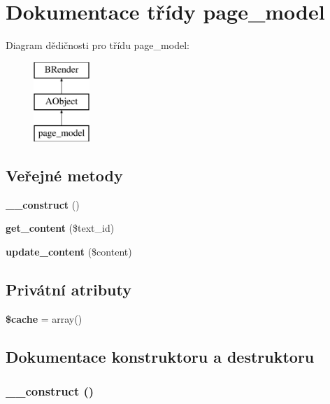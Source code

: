 \section{Dokumentace třídy page\_\-model}
\label{da/d19/classpage__model}
Diagram dědičnosti pro třídu page\_\-model:\begin{figure}[H]
\begin{center}
\leavevmode
\includegraphics[height=3cm]{da/d19/classpage__model}
\end{center}
\end{figure}
\subsection*{Veřejné metody}
\begin{DoxyCompactItemize}
\item 
{\bf \_\-\_\-construct} ()
\item 
{\bf get\_\-content} (\$text\_\-id)
\item 
{\bf update\_\-content} (\$content)
\end{DoxyCompactItemize}
\subsection*{Privátní atributy}
\begin{DoxyCompactItemize}
\item 
{\bf \$cache} = array()
\end{DoxyCompactItemize}


\subsection{Dokumentace konstruktoru a destruktoru}
\subsubsection[{\_\-\_\-construct}]{\setlength{\rightskip}{0pt plus 5cm}\_\-\_\-construct ()}\label{da/d19/classpage__model_a095c5d389db211932136b53f25f39685}


